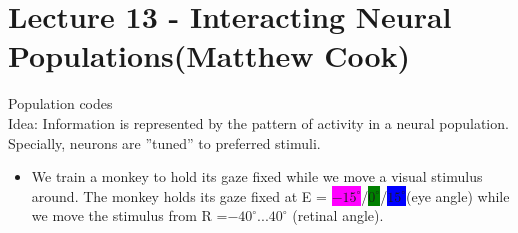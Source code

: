 \documentclass[english,11pt]{article}
\begin{document}
\section{Lecture 13 - Interacting Neural Populations(Matthew Cook)}

Population codes\\
Idea: Information is represented by the pattern of activity in a neural population. Specially, neurons are ''tuned'' to preferred stimuli.\\
\begin{itemize}
\item We train a monkey to hold its gaze fixed while we move a visual stimulus around. The monkey holds its gaze fixed at E = \colorbox{magenta}{$-15^\circ$}/\colorbox{green}{$0^\circ$}/\colorbox{blue}{$15^\circ$}(eye angle) while we move the stimulus from R =$-40^\circ ... 40^\circ$ (retinal angle).
\end{itemize}
\end{document}
